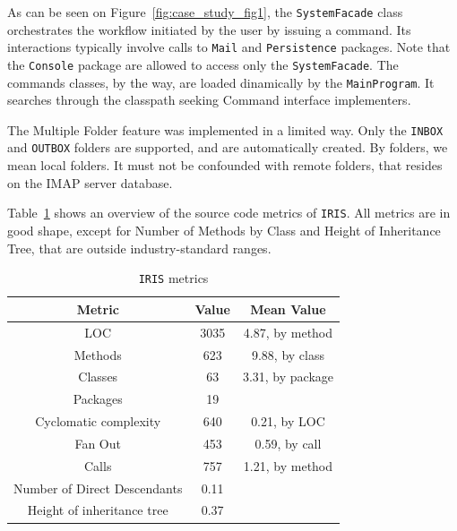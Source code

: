 As can be seen on Figure~\ref{fig:case_study_fig1}, the \texttt{SystemFacade} class orchestrates the workflow initiated by the user by issuing a command. Its interactions typically involve calls to \texttt{Mail} and \texttt{Persistence} packages. Note that the \texttt{Console} package are allowed to access only the \texttt{SystemFacade}. The commands classes, by the way, are loaded dinamically by the \texttt{MainProgram}. It searches through the classpath seeking Command interface implementers.

The Multiple Folder feature was implemented in a limited way. Only the \texttt{INBOX} and \texttt{OUTBOX} folders are supported, and are automatically created. By folders, we mean local folders. It must not be confounded with remote folders, that resides on the IMAP server database.

Table~\ref{table:case_study_tab1} shows an overview of the source code metrics of \texttt{IRIS}. All metrics are in good shape, except for Number of Methods by Class and Height of Inheritance Tree, that are outside industry-standard ranges.

\begin{table}[!ht]
\renewcommand{\arraystretch}{1.3}
\caption{\texttt{IRIS} metrics}
\label{table:case_study_tab1}
\centering
\begin{tabular}{|c|c|c|}
\hline
Metric & Value & Mean Value\\
\hline
LOC & 3035 & 4.87, by method\\
\hline
Methods & 623 & 9.88, by class \\
\hline
Classes & 63 & 3.31, by package \\
\hline
Packages & 19 & \\
\hline
Cyclomatic complexity & 640 & 0.21, by LOC \\
\hline
Fan Out & 453 & 0.59, by call \\
\hline
Calls & 757 & 1.21, by method \\
\hline
Number of Direct Descendants & 0.11 & \\
\hline
Height of inheritance tree & 0.37 & \\
\hline
\end{tabular}
\end{table}